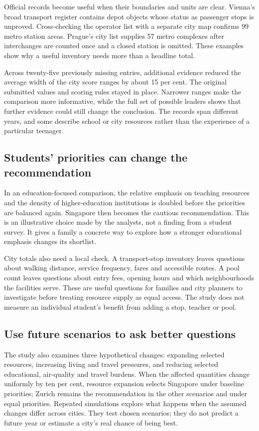 Official records become useful when their boundaries and units are clear. Vienna's broad transport register contains depot objects whose status as passenger stops is unproved. Cross-checking the operator list with a separate city map confirms 99 metro station areas. Prague's city list supplies 57 metro complexes after interchanges are counted once and a closed station is omitted. These examples show why a useful inventory needs more than a headline total.

Across twenty-five previously missing entries, additional evidence reduced the average width of the city score ranges by about 15 per cent. The original submitted values and scoring rules stayed in place. Narrower ranges make the comparison more informative, while the full set of possible leaders shows that further evidence could still change the conclusion. The records span different years, and some describe school or city resources rather than the experience of a particular teenager.

\newpage
\subsection*{Students' priorities can change the recommendation}

In an education-focused comparison, the relative emphasis on teaching resources and the density of higher-education institutions is doubled before the priorities are balanced again. Singapore then becomes the cautious recommendation. This is an illustrative choice made by the analysts, not a finding from a student survey. It gives a family a concrete way to explore how a stronger educational emphasis changes its shortlist.

City totals also need a local check. A transport-stop inventory leaves questions about walking distance, service frequency, fares and accessible routes. A pool count leaves questions about entry fees, opening hours and which neighbourhoods the facilities serve. These are useful questions for families and city planners to investigate before treating resource supply as equal access. The study does not measure an individual student's benefit from adding a stop, teacher or pool.

\subsection*{Use future scenarios to ask better questions}

The study also examines three hypothetical changes: expanding selected resources, increasing living and travel pressures, and reducing selected educational, air-quality and travel burdens. When the affected quantities change uniformly by ten per cent, resource expansion selects Singapore under baseline priorities; Zurich remains the recommendation in the other scenarios and under equal priorities. Repeated simulations explore what happens when the assumed changes differ across cities. They test chosen scenarios; they do not predict a future year or estimate a city's real chance of being best.

